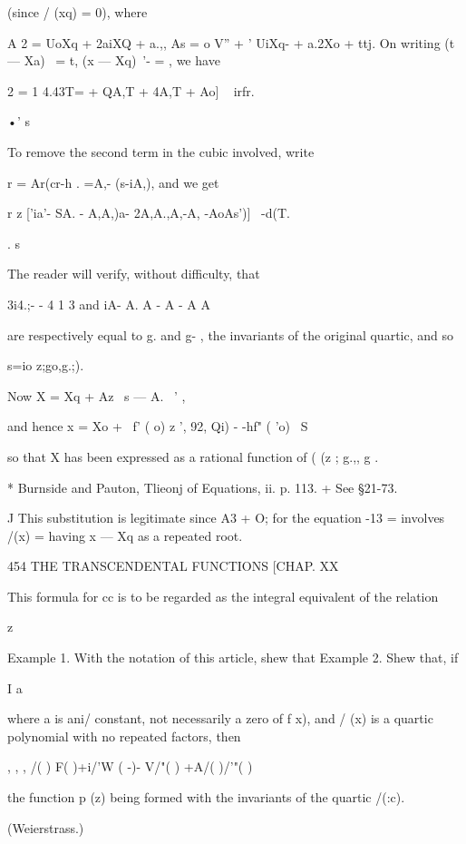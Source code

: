 {(since / (xq) = 0), where

A 2 = UoXq + 2aiXQ + a.,, As = o V'' + ' UiXq- + a.2Xo + ttj. On
writing (t — Xa)~ = t, (x — Xq)~'- = , we have

2 = 1 4.43T= + QA,T + 4A,T + Ao] ~ irfr.

•' s

To remove the second term in the cubic involved, write

r = Ar(cr-h . =A,- (s-iA,), and we get

r z ['ia'- SA. - A,A,)a- 2A,A.,A,-A, -AoAs')]~ -d(T.

. s

The reader will verify, without difficulty, that

3i4.;- - 4 1 3 and iA- A. A - A - A A

are respectively equal to g. and g- , the invariants of the original
quartic, and so

s=io z;go,g.;).

Now X = Xq + Az \ s — A. ~' ,

and hence x = Xo + \ f' ( o) z ', 92, Qi) - -hf" ( 'o) ~S

so that X has been expressed as a rational function of ( (z ; g.,, g .

* Burnside and Pauton, Tlieonj of Equations, ii. p. 113. + See §21-73.

J This substitution is legitimate since A3 + O; for the equation -13 =
involves /(x) = having x — Xq as a repeated root.



454 THE TRANSCENDENTAL FUNCTIONS [CHAP. XX

This formula for cc is to be regarded as the integral equivalent of
the relation



z



Example 1. With the notation of this article, shew that Example 2.
Shew that, if



I a



where a is ani/ constant, not necessarily a zero of f x), and / (x) is
a quartic polynomial with no repeated factors, then

, , , /( ) F( )+i/'W ( -)- V/"( ) +A/( )/'"( )

the function p (z) being formed with the invariants of the quartic
/(:c).

(Weierstrass.)

}
